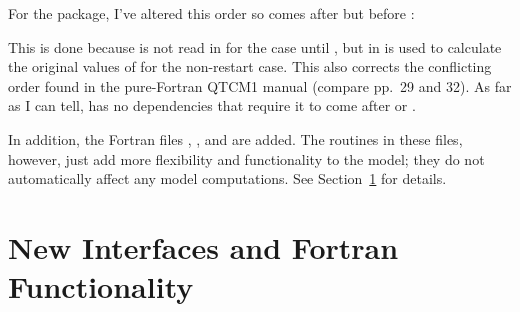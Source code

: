\begin{itemize}
	\begin{codeblock}
	\end{codeblock}

	For the  package, I've altered this order so
	 comes after  but before \mods{varinit}:
	\begin{codeblock}
	\end{codeblock}

	This is done because  is not read in for the
	  case until , but
	in   is used to calculate the
	original values of  for the non-restart case.  This
	also corrects the conflicting order found in the pure-Fortran
	QTCM1 manual (compare pp.\ 29 and 32).  As far as I can
	tell,  has no dependencies that require it
	to come after  or .

\end{itemize}

In addition, the Fortran files , ,
and  are added.  The routines in these files, 
however, just add more flexibility and functionality to the model;
they do not automatically affect any model computations.  See
Section~\ref{sec:newf90} for details.




\section{New Interfaces and Fortran Functionality}  \label{sec:newf90}

